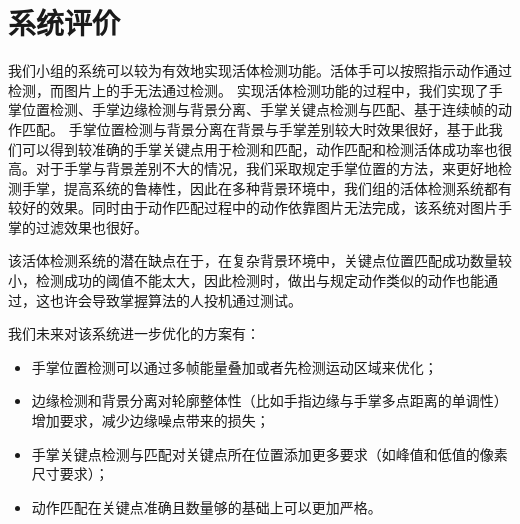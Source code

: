 \documentclass[UTF8, a4paper, fontset=none]{article}
\begin{document}
\section{系统评价}

我们小组的系统可以较为有效地实现活体检测功能。活体手可以按照指示动作通过检测，而图片上的手无法通过检测。
实现活体检测功能的过程中，我们实现了手掌位置检测、手掌边缘检测与背景分离、手掌关键点检测与匹配、基于连续帧的动作匹配。
手掌位置检测与背景分离在背景与手掌差别较大时效果很好，基于此我们可以得到较准确的手掌关键点用于检测和匹配，动作匹配和检测活体成功率也很高。对于手掌与背景差别不大的情况，我们采取规定手掌位置的方法，来更好地检测手掌，提高系统的鲁棒性，因此在多种背景环境中，我们组的活体检测系统都有较好的效果。同时由于动作匹配过程中的动作依靠图片无法完成，该系统对图片手掌的过滤效果也很好。

该活体检测系统的潜在缺点在于，在复杂背景环境中，关键点位置匹配成功数量较小，检测成功的阈值不能太大，因此检测时，做出与规定动作类似的动作也能通过，这也许会导致掌握算法的人投机通过测试。

我们未来对该系统进一步优化的方案有：
\begin{itemize}
  \item 手掌位置检测可以通过多帧能量叠加或者先检测运动区域来优化；
  \item 边缘检测和背景分离对轮廓整体性（比如手指边缘与手掌多点距离的单调性）增加要求，减少边缘噪点带来的损失；
  \item 手掌关键点检测与匹配对关键点所在位置添加更多要求（如峰值和低值的像素尺寸要求）；
  \item 动作匹配在关键点准确且数量够的基础上可以更加严格。
\end{itemize}
\end{document}
